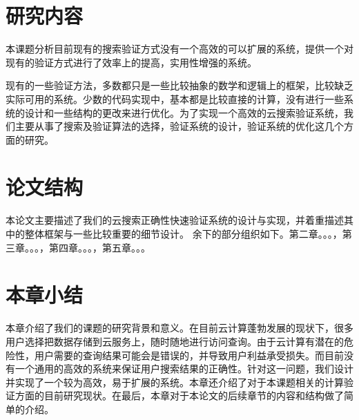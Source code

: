 \section{研究内容}
本课题分析目前现有的搜索验证方式没有一个高效的可以扩展的系统，提供一个对现有的验证方式进行了效率上的提高，实用性增强的系统。

现有的一些验证方法，多数都只是一些比较抽象的数学和逻辑上的框架，比较缺乏实际可用的系统。少数的代码实现中，基本都是比较直接的计算，没有进行一些系统的设计和一些结构的更改来进行优化。为了实现一个高效的云搜索验证系统，我们主要从事了搜索及验证算法的选择，验证系统的设计，验证系统的优化这几个方面的研究。

\section{论文结构}
本论文主要描述了我们的云搜索正确性快速验证系统的设计与实现，并着重描述其中的整体框架与一些比较重要的细节设计。
余下的部分组织如下。第二章。。。，第三章。。。，第四章。。。，第五章。。。

\section{本章小结}
本章介绍了我们的课题的研究背景和意义。在目前云计算蓬勃发展的现状下，很多用户选择把数据存储到云服务上，随时随地进行访问查询。由于云计算有潜在的危险性，用户需要的查询结果可能会是错误的，并导致用户利益承受损失。而目前没有一个通用的高效的系统来保证用户搜索结果的正确性。针对这一问题，我们设计并实现了一个较为高效，易于扩展的系统。本章还介绍了对于本课题相关的计算验证方面的目前研究现状。在最后，本章对于本论文的后续章节的内容和结构做了简单的介绍。
